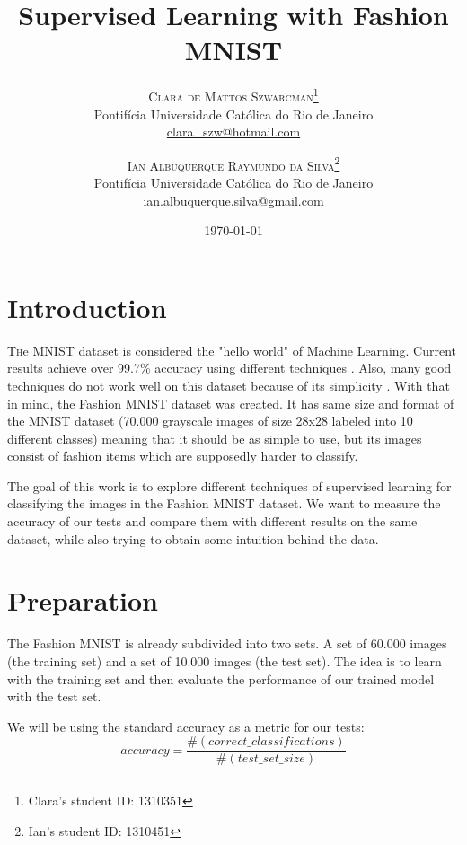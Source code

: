 \documentclass[twoside,twocolumn]{article}
\title{Supervised Learning with Fashion MNIST} %
\author{%
\textsc{Clara de Mattos Szwarcman}\thanks{Clara's student ID: 1310351} \\[1ex] %
\normalsize Pontifícia Universidade Católica do Rio de Janeiro \\ %
\normalsize \href{mailto:clara_szw@hotmail.com}{clara\_szw@hotmail.com} %
\and %
\textsc{Ian Albuquerque Raymundo da Silva}\thanks{Ian's student ID: 1310451} \\[1ex] %
\normalsize Pontifícia Universidade Católica do Rio de Janeiro \\ %
\normalsize \href{mailto:ian.albuquerque.silva@gmail.com}{ian.albuquerque.silva@gmail.com} %
}
\date{\today} %
\begin{document}
\maketitle


\section{Introduction}

\lettrine[nindent=0em,lines=3]{T} he MNIST dataset is considered the "hello world" of Machine Learning.
Current results achieve over 99.7\% accuracy using different techniques
\cite{LWan:2013dg} \cite{DCirean:2012dg} \cite{ISato:2015dg} \cite{JRChang:2015dg} \cite{CYLee:2015dg}.
Also, many good techniques do not work well on this dataset because of its simplicity \cite{CFran:2017dg}.
With that in mind, the Fashion MNIST dataset \cite{FashionMNIST} was created. It has same size and format
of the MNIST dataset (70.000 grayscale images of size 28x28 labeled into 10 different classes) meaning that
it should be as simple to use, but its images consist of fashion items which are supposedly harder to
classify.

The goal of this work is to explore different techniques of supervised learning for classifying the images
in the Fashion MNIST dataset. We want to measure the accuracy of our tests and compare them with different
results on the same dataset, while also trying to obtain some intuition behind the data.


\section{Preparation}

The Fashion MNIST is already subdivided into two sets. A set of 60.000 images (the training set)
and a set of 10.000 images (the test set). The idea is to learn with the training set and then
evaluate the performance of our trained model with the test set.

We will be using the standard accuracy as a metric for our tests:
\begin{equation}
\label{eq:acc}
accuracy = \frac{\#(correct\_classifications)}{\#(test\_set\_size)}
\end{equation}
\end{document}

